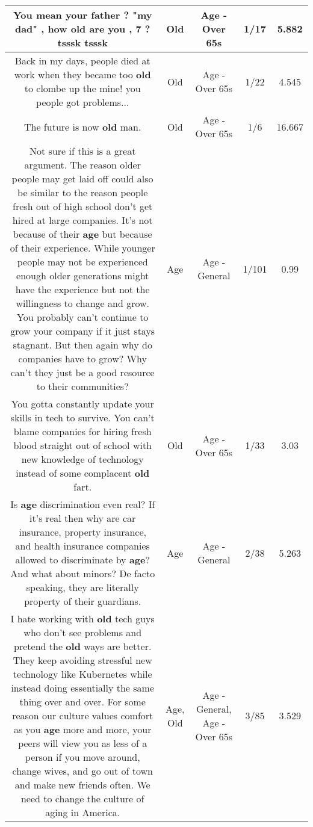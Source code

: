 \documentclass[11pt]{article}
\newlength\mylength
\begin{document}
\begin{center}
\begin{longtable}{|C{.65\mylength}|C{.30\mylength}|C{.12\mylength}|C{.12\mylength}|C{.12\mylength}|}
  \small You mean your father ?  "my dad" , how \textbf{old} are you , 7 ? tsssk tsssk\normalsize   & Old & Age - Over 65s & 1/17 & 5.882 \\  \hline
  \small Back in my days, people died at work when they became too \textbf{old} to clombe up the mine! you people got problems...\normalsize   & Old & Age - Over 65s & 1/22 & 4.545 \\  \hline
  \small The future is now \textbf{old} man.\normalsize   & Old & Age - Over 65s & 1/6 & 16.667 \\  \hline
  \small Not sure if this is a great argument. The reason older people may get laid off could also be similar to the reason people fresh out of high school don't get hired at large companies. It's not because of their \textbf{age} but because of their experience. While younger people may not be experienced enough older generations might have the experience but not the willingness to change and grow. You probably can't continue to grow your company if it just stays stagnant. But then again why do companies have to grow? Why can't they just be a good resource to their communities?\normalsize   & Age & Age - General & 1/101 & 0.99 \\  \hline
  \small You gotta constantly update your skills in tech to survive. You can't blame companies for hiring fresh blood straight out of school with new knowledge of technology instead of some complacent \textbf{old} fart.\normalsize   & Old & Age - Over 65s & 1/33 & 3.03 \\  \hline
  \small Is \textbf{age} discrimination even real? If it's real then why are car insurance, property insurance, and health insurance companies allowed to discriminate by \textbf{age}? And what about minors? De facto speaking, they are literally property of their guardians.\normalsize   & Age & Age - General & 2/38 & 5.263 \\  \hline
  \small I hate working with \textbf{old} tech guys who don't see problems and pretend the \textbf{old} ways are better. They keep avoiding stressful new technology like Kubernetes while instead doing essentially the same thing over and over. For some reason our culture values comfort as you \textbf{age} more and more, your peers will view you as less of a person if you move around, change wives, and go out of town and make new friends often. We need to change the culture of aging in America.\normalsize   & Age, Old & Age - General, Age - Over 65s & 3/85 & 3.529 \\  \hline

\end{longtable}
\end{center}
\end{document}
